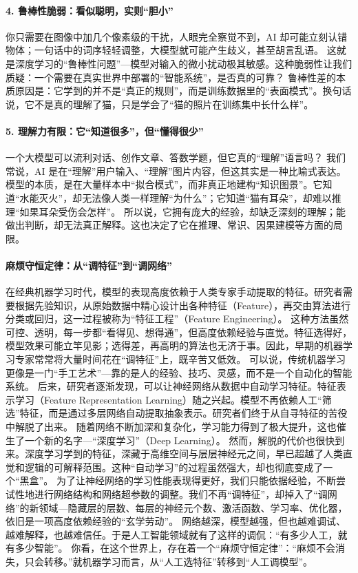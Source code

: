 \paragraph*{4. 鲁棒性脆弱：看似聪明，实则“胆小”}
你只需要在图像中加几个像素级的干扰，人眼完全察觉不到，AI 却可能立刻认错物体；一句话中的词序轻轻调整，大模型就可能产生歧义，甚至胡言乱语。
这就是深度学习的“鲁棒性问题”---模型对输入的微小扰动极其敏感。这种脆弱性让我们质疑：一个需要在真实世界中部署的“智能系统”，是否真的可靠？
鲁棒性差的本质原因是：它学到的并不是“真正的规则”，而是训练数据里的“表面模式”。换句话说，它不是真的理解了猫，只是学会了“猫的照片在训练集中长什么样”。

\paragraph*{5. 理解力有限：它“知道很多”，但“懂得很少”}
一个大模型可以流利对话、创作文章、答数学题，但它真的“理解”语言吗？
我们常说，AI 是在“理解”用户输入、“理解”图片内容，但这其实是一种比喻式表达。模型的本质，是在大量样本中“拟合模式”，而非真正地建构“知识图景”。它知道“水能灭火”，却无法像人类一样理解“为什么”；它知道“猫有耳朵”，却难以推理“如果耳朵受伤会怎样”。
所以说，它拥有庞大的经验，却缺乏深刻的理解；能做出判断，却无法真正解释。这也决定了它在推理、常识、因果建模等方面的局限。
\paragraph*{麻烦守恒定律：从“调特征”到“调网络”}
在经典机器学习时代，模型的表现高度依赖于人类专家手动提取的特征。研究者需要根据先验知识，从原始数据中精心设计出各种特征（Feature），再交由算法进行分类或回归，这一过程被称为“特征工程”（Feature Engineering）。
这种方法虽然可控、透明，每一步都“看得见、想得通”，但高度依赖经验与直觉。特征选得好，模型效果可能立竿见影；选得差，再高明的算法也无济于事。因此，早期的机器学习专家常常将大量时间花在“调特征”上，既辛苦又低效。
可以说，传统机器学习更像是一门“手工艺术”---靠的是人的经验、技巧、灵感，而不是一个自动化的智能系统。
后来，研究者逐渐发现，可以让神经网络从数据中自动学习特征。特征表示学习（Feature Representation Learning）随之兴起。模型不再依赖人工“筛选”特征，而是通过多层网络自动提取抽象表示。研究者们终于从自寻特征的苦役中解脱了出来。
随着网络不断加深和复杂化，学习能力得到了极大提升，这也催生了一个新的名字---“深度学习”（Deep Learning）。
然而，解脱的代价也很快到来。深度学习学到的特征，深藏于高维空间与层层神经元之间，早已超越了人类直觉和逻辑的可解释范围。这种“自动学习”的过程虽然强大，却也彻底变成了一个“黑盒”。
为了让神经网络的学习性能表现得更好，我们只能依据经验，不断尝试性地进行网络结构和网络超参数的调整。我们不再“调特征”，却掉入了“调网络”的新领域---隐藏层的层数、每层的神经元个数、激活函数、学习率、优化器，依旧是一项高度依赖经验的“玄学劳动”。
网络越深，模型越强，但也越难调试、越难解释，也越难信任。于是人工智能领域就有了这样的调侃：“有多少人工，就有多少智能”。
你看，在这个世界上，存在着一个“麻烦守恒定律”：“麻烦不会消失，只会转移。”就机器学习而言，从“人工选特征”转移到“人工调模型”。

